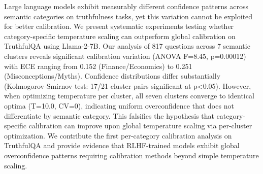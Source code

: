 Large language models exhibit measurably different confidence patterns across semantic categories on truthfulness tasks, yet this variation cannot be exploited for better calibration. We present systematic experiments testing whether category-specific temperature scaling can outperform global calibration on TruthfulQA using Llama-2-7B. Our analysis of 817 questions across 7 semantic clusters reveals significant calibration variation (ANOVA F=8.45, p=0.00012) with ECE ranging from 0.152 (Finance/Economics) to 0.251 (Misconceptions/Myths). Confidence distributions differ substantially (Kolmogorov-Smirnov test: 17/21 cluster pairs significant at p<0.05). However, when optimizing temperature per cluster, all seven clusters converge to identical optima (T=10.0, CV=0), indicating uniform overconfidence that does not differentiate by semantic category. This falsifies the hypothesis that category-specific calibration can improve upon global temperature scaling via per-cluster optimization. We contribute the first per-category calibration analysis on TruthfulQA and provide evidence that RLHF-trained models exhibit global overconfidence patterns requiring calibration methods beyond simple temperature scaling.
